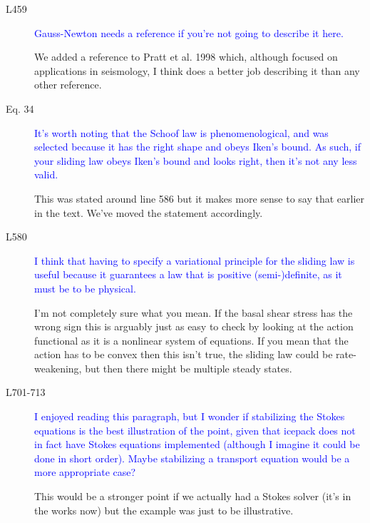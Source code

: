 \documentclass{article}
\theoremstyle{definition}
\theoremstyle{plain}
\begin{document}
\begin{description}
\item[L459] \textcolor{blue}{Gauss-Newton needs a reference if you're not going to describe it here.}

We added a reference to Pratt et al. 1998 which, although focused on applications in seismology, I think does a better job describing it than any other reference.

\item[Eq. 34] \textcolor{blue}{It's worth noting that the Schoof law is phenomenological, and was
selected because it has the right shape and obeys Iken's bound. As such,
if your sliding law obeys Iken's bound and looks right, then it's not any
less valid.}

This was stated around line 586 but it makes more sense to say that earlier in the text.
We've moved the statement accordingly.

\item[L580] \textcolor{blue}{I think that having to specify a variational principle for the sliding law
is useful because it guarantees a law that is positive (semi-)definite, as it
must be to be physical.}

I'm not completely sure what you mean.
If the basal shear stress has the wrong sign this is arguably just as easy to check by looking at the action functional as it is a nonlinear system of equations.
If you mean that the action has to be convex then this isn't true, the sliding law could be rate-weakening, but then there might be multiple steady states.

\item[L701-713] \textcolor{blue}{I enjoyed reading this paragraph, but I wonder if stabilizing the
Stokes equations is the best illustration of the point, given that icepack
does not in fact have Stokes equations implemented (although I imagine
it could be done in short order). Maybe stabilizing a transport equation
would be a more appropriate case?}

This would be a stronger point if we actually had a Stokes solver (it's in the works now) but the example was just to be illustrative.
\end{description}
\end{document}
